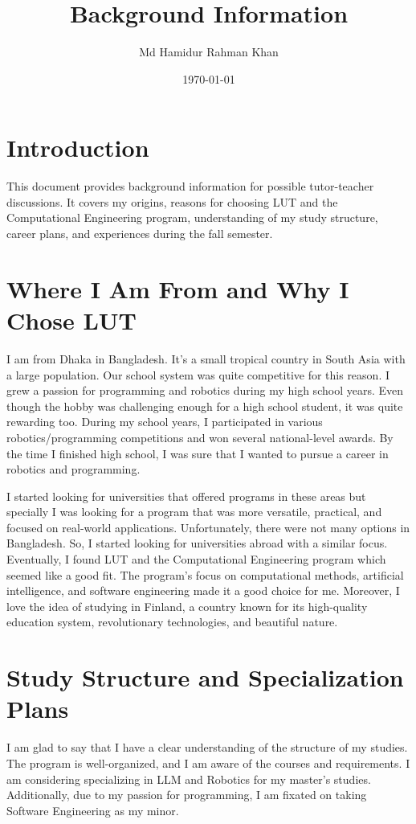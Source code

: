 \documentclass[12pt, titlepage, a4paper]{article}
\title{Background Information}
\author{Md Hamidur Rahman Khan}
\date{\today}
\begin{document}
\maketitle

\section{Introduction}
This document provides background information for possible tutor-teacher
discussions. It covers my origins, reasons for choosing LUT and the
Computational Engineering program, understanding of my study structure, 
career plans, and experiences during the fall semester.

\section{Where I Am From and Why I Chose LUT}

I am from Dhaka in Bangladesh. It's a small tropical country in South Asia
with a large population. Our school system was quite competitive for this reason.
I grew a passion for programming and robotics during my high school years. 
Even though the hobby was challenging enough for a high school student, it was
quite rewarding too. During my school years, I participated in various 
robotics/programming competitions and won several national-level awards. 
By the time I finished high school, I was sure that I wanted to pursue a career
in robotics and programming. 

I started looking for universities that offered programs in these areas but 
specially I was looking for a program that was more versatile, practical, and 
focused on real-world applications. Unfortunately, there were not many options
in Bangladesh. So, I started looking for universities abroad with a similar focus.
Eventually, I found LUT and the Computational Engineering program which seemed
like a good fit. The program's focus on computational methods, artificial 
intelligence, and software engineering made it a good choice for me. Moreover,
I love the idea of studying in Finland, a country known for its high-quality
education system, revolutionary technologies, and beautiful nature.

\section{Study Structure and Specialization Plans}
I am glad to say that I have a clear understanding of the structure of my studies. 
The program is well-organized, and I am aware of the courses and requirements. 
I am considering specializing in LLM and Robotics for my master's studies. 
Additionally, due to my passion for programming, I am fixated on taking Software 
Engineering as my minor.
\end{document}
